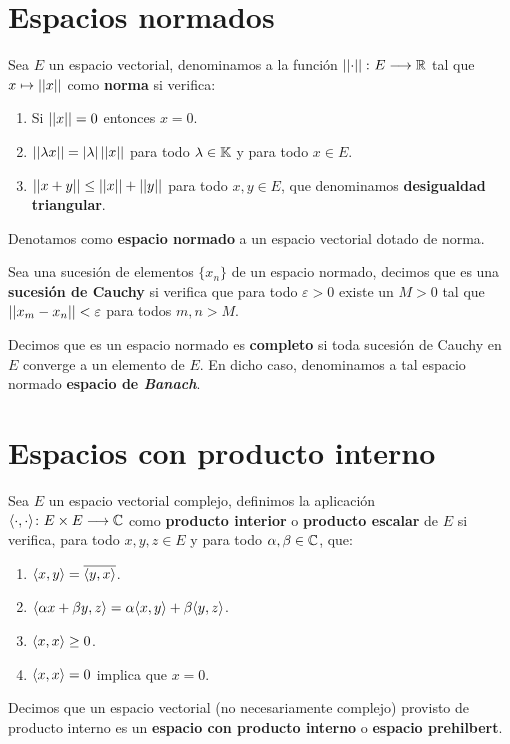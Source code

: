 \section{Espacios normados}

\begin{definition} Sea $E$ un espacio vectorial, denominamos a la función $\left|\left|\cdot\right|\right|\colon E\longrightarrow \mathbb{R}$ tal que $x\mapsto\left|\left|x\right|\right|$ como \textbf{norma} si verifica:
\begin{enumerate}[label=\alph*)]
\item Si $\left|\left|x\right|\right|=0$ entonces $x=0$.
\item $\left|\left|\lambda x\right|\right|=|\lambda|\left|\left|x\right|\right|$ para todo $\lambda\in\mathbb{K}$ y para todo $x\in E$.
\item $\left|\left|x+y\right|\right|\leq \left|\left|x\right|\right| + \left|\left|y\right|\right|$ para todo $x,y\in E$, que denominamos \textbf{desigualdad triangular}.
\end{enumerate}

Denotamos como \textbf{espacio normado} a un espacio vectorial dotado de norma.
\end{definition}

\begin{definition} Sea una sucesión de elementos $\{x_n\}$ de un espacio normado, decimos que es una \textbf{sucesión de Cauchy} si verifica que para todo $\varepsilon>0$ existe un $M>0$ tal que $\left|\left|x_m-x_n\right|\right|<\varepsilon$ para todos $m,n>M$.
\end{definition}

\begin{definition} Decimos que es un espacio normado es \textbf{completo} si toda sucesión de Cauchy en $E$ converge a un elemento de $E$. En dicho caso, denominamos a tal espacio normado \textbf{espacio de \textit{Banach}}.
\end{definition}

\section{Espacios con producto interno}

\begin{definition} Sea $E$ un espacio vectorial complejo, definimos la aplicación \\$\langle\cdot,\cdot\rangle\colon E\times E\longrightarrow \mathbb{C}$ como \textbf{producto interior} o \textbf{producto escalar} de $E$ si verifica, para todo $x,y,z\in E$ y para todo $\alpha,\beta\in\mathbb{C}$, que:
\begin{enumerate}[label=\alph*)]
\item $\langle x,y\rangle=\overline{\langle y,x\rangle}$.
\item $\langle\alpha x + \beta y,z\rangle= \alpha \langle x,y\rangle + \beta \langle y,z\rangle$.
\item $\langle x,x\rangle\geq 0$.
\item $\langle x,x\rangle= 0$ implica que $x=0$.
\end{enumerate}

Decimos que un espacio vectorial (no necesariamente complejo) provisto de producto interno es un \textbf{espacio con producto interno} o \textbf{espacio prehilbert}.
\end{definition}

